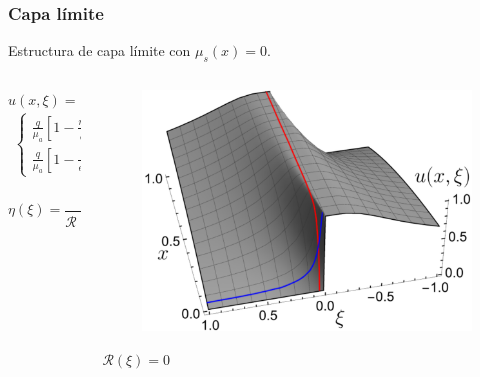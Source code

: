 \begin{frame}
\frametitle{Capa límite}
Estructura de capa límite con $\mu_s(x)=0$.
\begin{columns}[c]
\begin{column}{0.5\textwidth}
$u(x,\xi)=$
\begin{equation*}
\begin{split}
\begin{cases}
\displaystyle \frac{q}{\mu_a}\left[1-\frac{\eta(\xi)}{ e^{\mu_a x / \xi}}\right]&\forall\xi>0,\\[8pt]
\displaystyle  \frac{q}{\mu_a}\left[1- \frac{\eta(\xi)}{e^{\mu_a (x-1) / \xi}} \right]&\forall\xi<0,
\end{cases}
\end{split}
\end{equation*}

\begin{equation*}
\eta(\xi)=\frac{\mathcal{R}(|\xi|)-1}{\mathcal{R}(|\xi|)e^{-\mu_a/|\xi|}-1}
\end{equation*}

\end{column}
\begin{column}{0.5\textwidth}
\begin{figure}[h!]
\centering
  \includegraphics[width=1.1\linewidth]{figuras/Analytic_lay_3.pdf}
 \label{fig:ansol}
\end{figure}
\centering
 $\mathcal{R}(\xi)=0$
\end{column}
\end{columns}
\end{frame}


